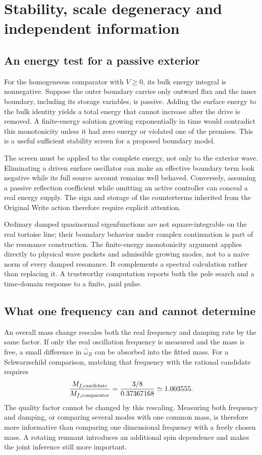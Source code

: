 \section{Stability, scale degeneracy and independent information}
\subsection{An energy test for a passive exterior}
For the homogeneous comparator with $V\geq0$, its bulk energy integral is nonnegative. Suppose the outer boundary carries only outward flux and the inner boundary, including its storage variables, is passive. Adding the surface energy to the bulk identity yields a total energy that cannot increase after the drive is removed. A finite-energy solution growing exponentially in time would contradict this monotonicity unless it had zero energy or violated one of the premises. This is a useful sufficient stability screen for a proposed boundary model.

The screen must be applied to the complete energy, not only to the exterior wave. Eliminating a driven surface oscillator can make an effective boundary term look negative while its full source account remains well behaved. Conversely, assuming a passive reflection coefficient while omitting an active controller can conceal a real energy supply. The sign and storage of the counterterms inherited from the Original Write action therefore require explicit attention.

Ordinary damped quasinormal eigenfunctions are not square-integrable on the real tortoise line; their boundary behavior under complex continuation is part of the resonance construction. The finite-energy monotonicity argument applies directly to physical wave packets and admissible growing modes, not to a naive norm of every damped resonance. It complements a spectral calculation rather than replacing it. A trustworthy computation reports both the pole search and a time-domain response to a finite, paid pulse.

\subsection{What one frequency can and cannot determine}
An overall mass change rescales both the real frequency and damping rate by the same factor. If only the real oscillation frequency is measured and the mass is free, a small difference in $\widehat\omega_R$ can be absorbed into the fitted mass. For a Schwarzschild comparison, matching that frequency with the rational candidate requires
\begin{equation}
 \frac{M_{f,\rm candidate}}{M_{f,\rm comparator}}
 =\frac{3/8}{0.37367168}\simeq1.003555.
 \label{c11:massdegeneracy}
\end{equation}
The quality factor cannot be changed by this rescaling. Measuring both frequency and damping, or comparing several modes with one common mass, is therefore more informative than comparing one dimensional frequency with a freely chosen mass. A rotating remnant introduces an additional spin dependence and makes the joint inference still more important.

